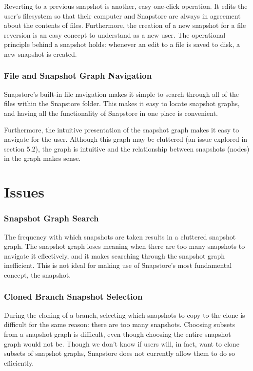 Reverting to a previous snapshot is another, easy one-click operation. It edits the user's filesystem so that their computer and Snapstore are always in agreement about the contents of files. Furthermore, the creation of a new snapshot for a file reversion is an easy concept to understand as a new user. The operational principle behind a snapshot holds: whenever an edit to a file is saved to disk, a new snapshot is created.

\subsubsection{File and Snapshot Graph Navigation}

Snapstore's built-in file navigation makes it simple to search through all of the files within the Snapstore folder. This makes it easy to locate snapshot graphs, and having all the functionality of Snapstore in one place is convenient.

Furthermore, the intuitive presentation of the snapshot graph makes it easy to navigate for the user. Although this graph may be cluttered (an issue explored in section 5.2), the graph is intuitive and the relationship between snapshots (nodes) in the graph makes sense.

\section{Issues}

\subsubsection{Snapshot Graph Search}

The frequency with which snapshots are taken results in a cluttered snapshot graph. The snapshot graph loses meaning when there are too many snapshots to navigate it effectively, and it makes searching through the snapshot graph inefficient. This is not ideal for making use of Snapstore's most fundamental concept, the snapshot.

\subsubsection{Cloned Branch Snapshot Selection}

During the cloning of a branch, selecting which snapshots to copy to the clone is difficult for the same reason: there are too many snapshots. Choosing subsets from a snapshot graph is difficult, even though choosing the entire snapshot graph would not be. Though we don't know if users will, in fact, want to clone subsets of snapshot graphs, Snapstore does not currently allow them to do so efficiently.

